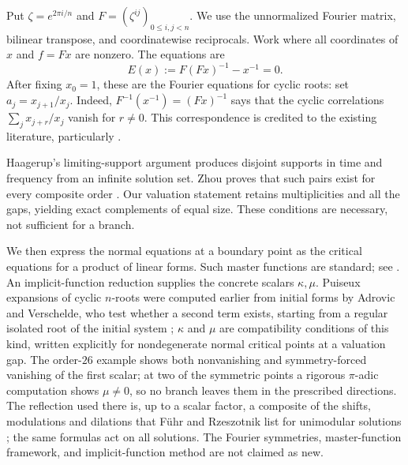 \documentclass[11pt]{article}
\theoremstyle{remark}\newtheorem{remark}[theorem]{Remark}
\begin{document}
Put $\zeta=e^{2\pi i/n}$ and $F=(\zeta^{ij})_{0\le i,j<n}$.
We use the unnormalized Fourier matrix, bilinear transpose, and
coordinatewise reciprocals. Work where all coordinates of $x$ and
$f=Fx$ are nonzero. The equations are
\begin{equation}\label{eq:critical}
 E(x):=F(Fx)^{-1}-x^{-1}=0.
\end{equation}
After fixing $x_0=1$, these are the Fourier equations for cyclic roots:
set $a_j=x_{j+1}/x_j$. Indeed, $F^{-1}(x^{-1})=(Fx)^{-1}$ says that
the cyclic correlations $\sum_j x_{j+r}/x_j$ vanish for $r\ne0$.
This correspondence is credited to the existing literature,
particularly \cite{Haagerup}.

Haagerup's limiting-support argument produces disjoint supports in time
and frequency from an infinite solution set. Zhou proves that such pairs
exist for every composite order \cite{Zhou}. Our valuation statement
retains multiplicities and all the gaps, yielding exact complements of
equal size. These conditions are necessary, not sufficient for a branch.

We then express the normal equations at a boundary point as the critical
equations for a product of linear forms. Such master functions are standard;
see \cite{CDFV}. An implicit-function reduction supplies the concrete scalars
$\kappa,\mu$. Puiseux expansions of cyclic $n$-roots were computed earlier
from initial forms by Adrovic and Verschelde, who test whether a second term
exists, starting from a regular isolated root of the initial system \cite[Sec.~5.1]{AV};
$\kappa$ and $\mu$ are compatibility conditions of this kind, written
explicitly for nondegenerate normal critical points at a valuation gap. The
order-$26$ example shows both nonvanishing and symmetry-forced vanishing of
the first scalar; at two of the symmetric points a rigorous $\pi$-adic
computation shows $\mu\ne0$, so no branch leaves them in the prescribed
directions. The reflection used there is, up to a scalar factor, a
composite of the shifts, modulations and dilations that F\"uhr and Rzeszotnik
list for unimodular solutions \cite[Sec.~10.3]{FR}; the same formulas act on
all solutions. The Fourier symmetries, master-function framework, and
implicit-function method are not claimed as new.
\end{document}
